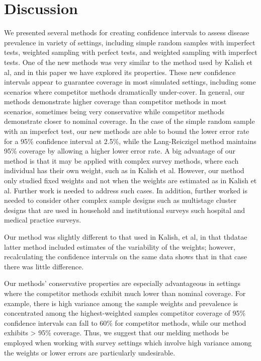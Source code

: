 \documentclass[AMA,STIX1COL]{WileyNJD-v2}
\begin{document}
\pagebreak

\section{Discussion}

We presented several methods for creating confidence intervals to assess disease prevalence in variety of settings, including simple random samples with imperfect tests, weighted sampling with perfect tests, and weighted sampling with imperfect tests.
One of the new methods was very similar to the method used by Kalish et al\cite{Kali:2021}, and in this paper we have explored its properties.
These new confidence intervals appear to guarantee coverage in most simulated settings, including some scenarios where competitor methods dramatically under-cover.
In general, our methods demonstrate higher coverage than competitor methods in most scenarios, sometimes being very conservative while competitor methods demonstrate closer to nominal coverage.
In the case of the simple random sample with an imperfect test, our new methods are able to bound the lower error rate for a 95\% confidence interval at 2.5\%, while the Lang-Reiczigel\cite{Lang:2014} method maintains 95\% coverage by allowing a higher lower error rate.
A big advantage of our method is that it may be applied with complex survey methods, where each individual has their own weight, such as in Kalish et al\cite{Kali:2021}. 
However, our method  only studied fixed weights and not when the weights are estimated as in Kalish et al.  Further work is needed to address such cases.  In addition, further worked is needed to consider other complex sample designs such as multistage cluster designs that are used in  household and institutional surveys such hospital and medical practice surveys.



Our method was slightly different to that used in Kalish, et al\cite{Kali:2021}, in that thdatae latter method included estimates of the variability of the weights; however, recalculating the confidence intervals on the same data shows that in that case there was little difference. 



Our methods' conservative properties are especially advantageous in settings where the competitor methods exhibit much lower than nominal coverage.
For example, there is high variance among the sample weights and prevalence is concentrated among the highest-weighted samples competitor coverage of 95\% confidence intervals can fall to 60\% for competitor methods, while our method exhibits > 95\% coverage.
Thus, we suggest that our melding methods be employed when working with survey settings which involve high variance among the weights or lower errors are particularly undesirable.
\end{document}
